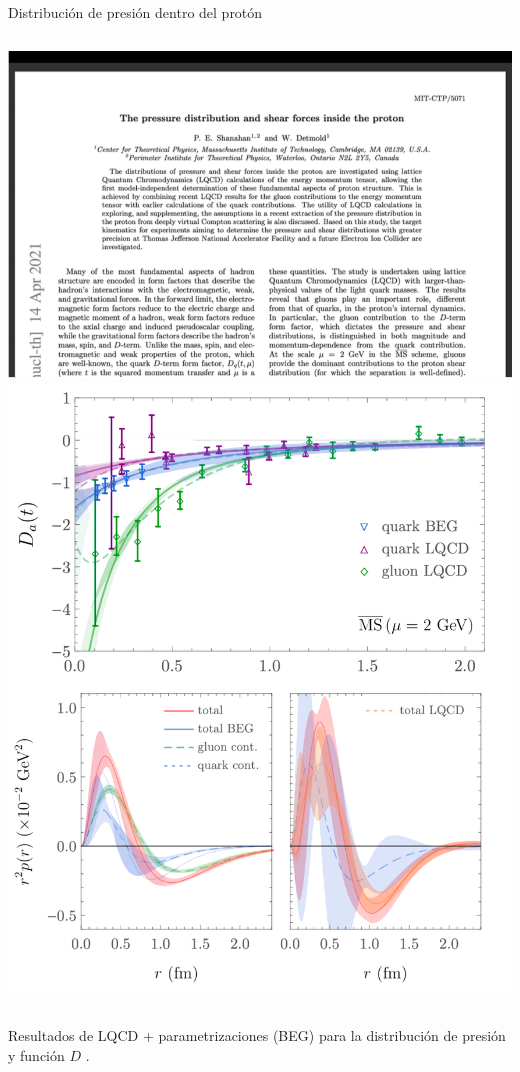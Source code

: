\documentclass{beamer}
\begin{document}
\begin{frame}{Distribución de presión dentro del protón}
  \begin{columns}
    \includegraphics[width=\linewidth]{figures/shanahan_pressure_paper.png}
    \includegraphics[width=0.8\linewidth]{figures/shanahan_pressure_plots.png}
  \end{columns}
  \vspace{1em}
  \scriptsize \color{black} Resultados de LQCD + parametrizaciones (BEG) para la distribución de presión y función \( D \) \cite{shanahanPressureDistributionShear2019}.

\end{frame}
\end{document}
